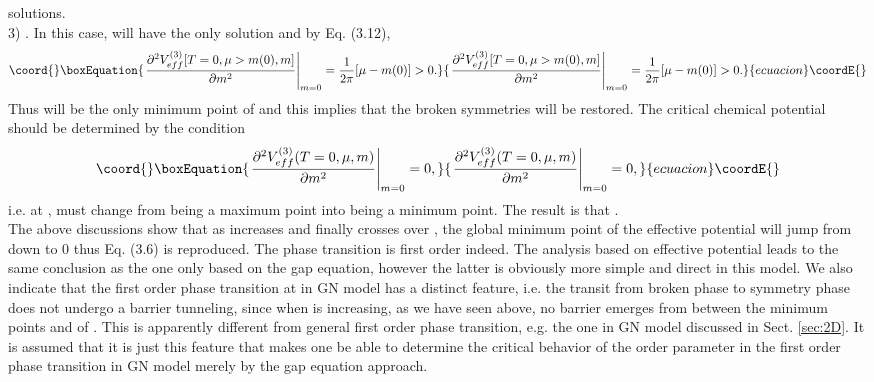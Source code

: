 \documentclass[a4paper,eqsecnum]{revtex4}
\begin{document}
solutions.\\
3) \coordHE{}. In this case, \coordHE{}
 will have the only solution \coordHE{} and by Eq. (3.12),
\begin{equation}\coord{}\boxEquation{
\left.\frac{\partial^2 V_{eff}^{(3)}[T=0,\mu>m(0),m]}{\partial m^2}\right|_{m=0}
=\frac{1}{2\pi}[\mu-m(0)]>0.
}{
\left.\frac{\partial^2 V_{eff}^{(3)}[T=0,\mu>m(0),m]}{\partial m^2}\right|_{m=0}
=\frac{1}{2\pi}[\mu-m(0)]>0.
}{ecuacion}\coordE{}\end{equation}%
Thus \coordHE{} will be the only minimum point of \coordHE{} and this 
implies that the broken symmetries will be restored. The critical chemical potential 
\coordHE{} should be determined by the condition
\begin{equation}\coord{}\boxEquation{
\left.\frac{\partial^2 V_{eff}^{(3)}(T=0,\mu,m)}{\partial m^2}\right|_{m=0}=0,
}{
\left.\frac{\partial^2 V_{eff}^{(3)}(T=0,\mu,m)}{\partial m^2}\right|_{m=0}=0,
}{ecuacion}\coordE{}\end{equation}%
i.e. at \coordHE{}, \coordHE{} must change from being a maximum point into being a minimum point.  The result is that \coordHE{}.\\
\indent The above discussions show that as \myHighlight{$\mu$}\coordHE{} increases and finally crosses over 
\coordHE{}, the global minimum point of the effective potential 
\coordHE{} will jump from \coordHE{} down to 0 thus Eq. (3.6) is 
reproduced. The phase transition is first order indeed. The analysis based on effective potential leads to the same conclusion as the one only based on the gap equation, however the latter is obviously more simple and direct in this model. We
also indicate that the first order phase transition at \coordHE{} in \coordHE{} GN model has 
a distinct feature, i.e. the transit from broken phase to symmetry phase does not 
undergo a barrier tunneling, since when \myHighlight{$\mu$}\coordHE{} is increasing, as we have seen above, 
no barrier emerges from between the minimum points \coordHE{} and \coordHE{} of 
\coordHE{}. This is apparently different from general first order 
phase transition, e.g. the one in \coordHE{} GN model discussed in Sect. \ref{sec:2D}. 
It is assumed that it is just this feature that makes one be able to determine the 
critical behavior of the order parameter in the first order phase transition in \coordHE{} 
GN model merely by the gap equation approach. 
\end{document}
